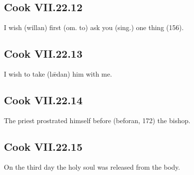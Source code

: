 \par\begin{minipage}{\linewidth}\raggedright
\subsection*{Cook VII.22.12}

I wish (willan) first (om. to) ask you (sing.) one thing (156).

\end{minipage}\par\addvspace{4pt}

\par\begin{minipage}{\linewidth}\raggedright
\subsection*{Cook VII.22.13}

I wish to take (lǣdan) him with me.

\end{minipage}\par\addvspace{4pt}

\par\begin{minipage}{\linewidth}\raggedright
\subsection*{Cook VII.22.14}

The priest prostrated himself before (beforan, 172) the bishop.

\end{minipage}\par\addvspace{4pt}

\par\begin{minipage}{\linewidth}\raggedright
\subsection*{Cook VII.22.15}

On the third day the holy soul was released from the body.

\end{minipage}\par\addvspace{4pt}


